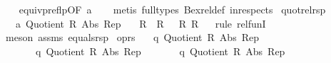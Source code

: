 \begin{isabellebody}
%
\isadelimproof
\ \ %
\endisadelimproof
%
\isatagproof
{}\isamarkupfalse%
\ equivp{\isacharunderscore}{\kern0pt}reflp{\isacharbrackleft}{\kern0pt}OF\ a{\isacharbrackright}{\kern0pt}\isanewline
\ \ \isamarkupfalse%
\ {\isacharparenleft}{\kern0pt}metis\ {\isacharparenleft}{\kern0pt}full{\isacharunderscore}{\kern0pt}types{\isacharparenright}{\kern0pt}\ Bex{}{\isacharunderscore}{\kern0pt}rel{\isacharunderscore}{\kern0pt}def\ in{\isacharunderscore}{\kern0pt}respects{\isacharparenright}{\kern0pt}%
\endisatagproof
{\isafoldproof}%
%
\isadelimproof
%
\endisadelimproof
%
\isadelimdocument
%
\endisadelimdocument
%
\isatagdocument
%
\isamarkuptrue%
%
\endisatagdocument
{\isafolddocument}%
%
\isadelimdocument
%
\endisadelimdocument
{}\isamarkupfalse%
\ quot{\isacharunderscore}{\kern0pt}rel{\isacharunderscore}{\kern0pt}rsp{\isacharcolon}{\kern0pt}\isanewline
\ \ \ a{\isacharcolon}{\kern0pt}\ {\isachardoublequoteopen}Quotient{}\ R\ Abs\ Rep{\isachardoublequoteclose}\isanewline
\ \ \ {\isachardoublequoteopen}{\isacharparenleft}{\kern0pt}R\ {\isacharequal}{\kern0pt}{\isacharequal}{\kern0pt}{\isacharequal}{\kern0pt}{\isachargreater}{\kern0pt}\ R\ {\isacharequal}{\kern0pt}{\isacharequal}{\kern0pt}{\isacharequal}{\kern0pt}{\isachargreater}{\kern0pt}\ {\isacharparenleft}{\kern0pt}{\isacharequal}{\kern0pt}{\isacharparenright}{\kern0pt}{\isacharparenright}{\kern0pt}\ R\ R{\isachardoublequoteclose}\isanewline
%
\isadelimproof
\ \ %
\endisadelimproof
%
\isatagproof
{}\isamarkupfalse%
{\isacharparenleft}{\kern0pt}rule\ rel{\isacharunderscore}{\kern0pt}funI{\isacharparenright}{\kern0pt}{\isacharplus}{\kern0pt}\isanewline
\ \ \isamarkupfalse%
\ {\isacharparenleft}{\kern0pt}meson\ assms\ equals{\isacharunderscore}{\kern0pt}rsp{\isacharparenright}{\kern0pt}%
\endisatagproof
{\isafoldproof}%
%
\isadelimproof
\isanewline
%
\endisadelimproof
\isanewline
{}\isamarkupfalse%
\ o{\isacharunderscore}{\kern0pt}prs{\isacharcolon}{\kern0pt}\isanewline
\ \ \ q{}{\isacharcolon}{\kern0pt}\ {\isachardoublequoteopen}Quotient{}\ R{}\ Abs{}\ Rep{}{\isachardoublequoteclose}\isanewline
\ \ \ \ \ \ \ q{}{\isacharcolon}{\kern0pt}\ {\isachardoublequoteopen}Quotient{}\ R{}\ Abs{}\ Rep{}{\isachardoublequoteclose}\isanewline
\ \ \ \ \ \ \ q{}{\isacharcolon}{\kern0pt}\ {\isachardoublequoteopen}Quotient{}\ R{}\ Abs{}\ Rep{}{\isachardoublequoteclose}\isanewline

\end{isabellebody}
